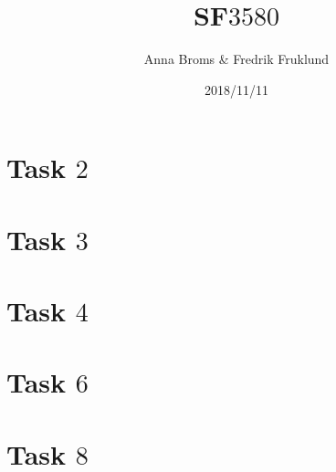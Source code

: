 \documentclass[a4paper]{article}
\title{SF$3580$}
\author{Anna Broms \& Fredrik Fruklund}
\date{2018/11/11}
\begin{document}
\maketitle

\section{Task $2$}



\section{Task $3$}


\section{Task $4$}

\section{Task $6$}

\section{Task $8$}






\end{document}
